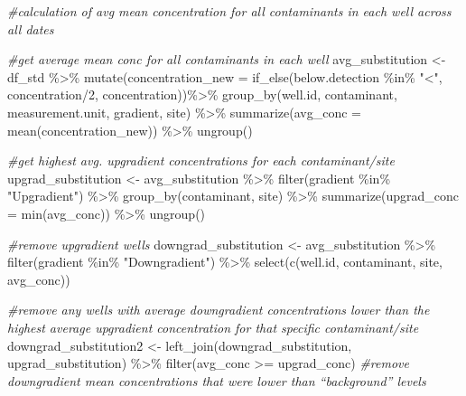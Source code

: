 \documentclass[12pt, twoside]{amherstthesis}
\newenvironment{Shaded}{\begin{snugshade}}{\end{snugshade}}
\newcommand{\AttributeTok}[1]{\textcolor[rgb]{0.77,0.63,0.00}{#1}}
\newcommand{\CommentTok}[1]{\textcolor[rgb]{0.56,0.35,0.01}{\textit{#1}}}
\newcommand{\DecValTok}[1]{\textcolor[rgb]{0.00,0.00,0.81}{#1}}
\newcommand{\FunctionTok}[1]{\textcolor[rgb]{0.00,0.00,0.00}{#1}}
\newcommand{\NormalTok}[1]{#1}
\newcommand{\OtherTok}[1]{\textcolor[rgb]{0.56,0.35,0.01}{#1}}
\newcommand{\SpecialCharTok}[1]{\textcolor[rgb]{0.00,0.00,0.00}{#1}}
\newcommand{\StringTok}[1]{\textcolor[rgb]{0.31,0.60,0.02}{#1}}
\begin{document}
\begin{Shaded}
\begin{Highlighting}[]
\CommentTok{\#calculation of avg mean concentration for all contaminants in each well across all dates}

\CommentTok{\#get average mean conc for all contaminants in each well}
\NormalTok{avg\_substitution }\OtherTok{\textless{}{-}}\NormalTok{ df\_std }\SpecialCharTok{\%\textgreater{}\%}
  \FunctionTok{mutate}\NormalTok{(}\AttributeTok{concentration\_new =} \FunctionTok{if\_else}\NormalTok{(below.detection }\SpecialCharTok{\%in\%} \StringTok{"\textless{}"}\NormalTok{, }
\NormalTok{                                     concentration}\SpecialCharTok{/}\DecValTok{2}\NormalTok{, concentration))}\SpecialCharTok{\%\textgreater{}\%}
  \FunctionTok{group\_by}\NormalTok{(well.id, contaminant, measurement.unit, gradient, site) }\SpecialCharTok{\%\textgreater{}\%}
  \FunctionTok{summarize}\NormalTok{(}\AttributeTok{avg\_conc =} \FunctionTok{mean}\NormalTok{(concentration\_new)) }\SpecialCharTok{\%\textgreater{}\%}
  \FunctionTok{ungroup}\NormalTok{()}

\CommentTok{\#get highest avg. upgradient concentrations for each contaminant/site}
\NormalTok{upgrad\_substitution }\OtherTok{\textless{}{-}}\NormalTok{ avg\_substitution }\SpecialCharTok{\%\textgreater{}\%}
  \FunctionTok{filter}\NormalTok{(gradient }\SpecialCharTok{\%in\%} \StringTok{"Upgradient"}\NormalTok{) }\SpecialCharTok{\%\textgreater{}\%}
  \FunctionTok{group\_by}\NormalTok{(contaminant, site) }\SpecialCharTok{\%\textgreater{}\%}
  \FunctionTok{summarize}\NormalTok{(}\AttributeTok{upgrad\_conc =} \FunctionTok{min}\NormalTok{(avg\_conc)) }\SpecialCharTok{\%\textgreater{}\%}
  \FunctionTok{ungroup}\NormalTok{()}

\CommentTok{\#remove upgradient wells}
\NormalTok{downgrad\_substitution }\OtherTok{\textless{}{-}}\NormalTok{ avg\_substitution }\SpecialCharTok{\%\textgreater{}\%}
  \FunctionTok{filter}\NormalTok{(gradient }\SpecialCharTok{\%in\%} \StringTok{"Downgradient"}\NormalTok{) }\SpecialCharTok{\%\textgreater{}\%}
  \FunctionTok{select}\NormalTok{(}\FunctionTok{c}\NormalTok{(well.id, contaminant, site, avg\_conc))}

\CommentTok{\#remove any wells with average downgradient concentrations lower than the highest average upgradient concentration for that specific contaminant/site}
\NormalTok{downgrad\_substitution2 }\OtherTok{\textless{}{-}} \FunctionTok{left\_join}\NormalTok{(downgrad\_substitution, upgrad\_substitution) }\SpecialCharTok{\%\textgreater{}\%}
  \FunctionTok{filter}\NormalTok{(avg\_conc }\SpecialCharTok{\textgreater{}=}\NormalTok{ upgrad\_conc) }\CommentTok{\#remove downgradient mean concentrations that were lower than “background” levels}



\end{Highlighting}
\end{Shaded}
\end{document}
